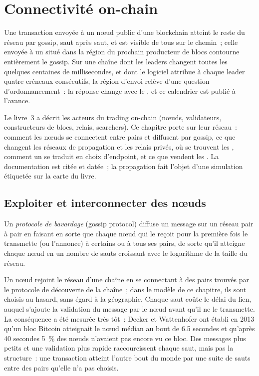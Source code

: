 \chapter{Connectivité on-chain}\label{ch:nw:on-chain-connectivity}

Une transaction envoyée à un nœud public d'une blockchain atteint le reste du réseau par gossip, saut après saut, et est visible de tous sur le
chemin~; celle envoyée à un  situé dans la région du prochain producteur de blocs contourne entièrement le gossip. Sur une chaîne dont les leaders changent toutes les
quelques centaines de millisecondes, et dont le logiciel attribue à chaque leader quatre créneaux consécutifs, la région d'envoi relève d'une question d'ordonnancement~: la
réponse change avec le , et ce calendrier est publié à l'avance.

Le livre~3 a décrit les acteurs du trading on-chain (nœuds, validateurs, constructeurs de blocs, relais, searchers). Ce chapitre porte sur leur réseau~: comment
les nœuds se connectent entre pairs et diffusent par gossip, ce que changent les réseaux de propagation et les relais privés, où se trouvent les , comment un  se traduit en
choix d'endpoint, et ce que vendent les . La documentation est citée et datée~; la propagation fait l'objet d'une simulation étiquetée sur
la carte du livre.

\section{Exploiter et interconnecter des nœuds}

\begin{definition}\label{def:nw:on-chain-connectivity:gossip}
Un \emph{protocole de bavardage} (gossip protocol) diffuse un message sur un réseau pair à pair en faisant en sorte que chaque nœud qui le reçoit pour la
première fois le transmette (ou l'annonce) à certains ou à tous ses pairs, de sorte qu'il atteigne chaque nœud en un nombre de sauts croissant avec le logarithme de
la taille du réseau.
\end{definition}

Un nœud rejoint le réseau d'une chaîne en se connectant à des pairs trouvés par le protocole de découverte de la chaîne~; dans le modèle de ce chapitre, ils sont choisis au
hasard, sans égard à la géographie. Chaque saut coûte le délai du lien, auquel s'ajoute la validation du message par le nœud avant qu'il ne le transmette. La conséquence a été mesurée très tôt~:
Decker et Wattenhofer ont établi en 2013 qu'un bloc Bitcoin atteignait le nœud médian au bout de 6.5 secondes et qu'après 40 secondes 5~\% des nœuds n'avaient
pas encore vu ce bloc. Des messages plus petits et une validation plus rapide raccourcissent chaque saut, mais pas la structure~: une transaction atteint
l'autre bout du monde par une suite de sauts entre des pairs qu'elle n'a pas choisis.

